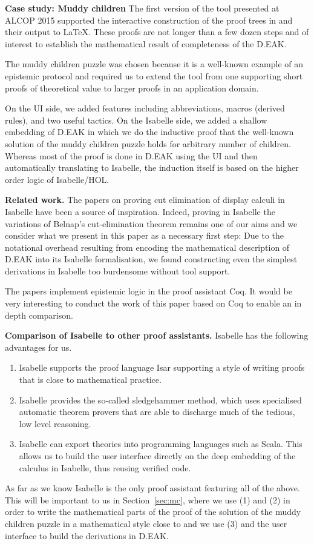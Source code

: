 \documentclass[runningheads,a4paper]{llncs}
\begin{document}
\medskip\noindent\textbf{Case study: Muddy children}
 The first version of the tool presented at ALCOP 2015 supported the interactive construction of the proof trees in \cite{DEAK} and their output to \LaTeX. These proofs are not longer than a few dozen steps and of interest to establish  the mathematical result of completeness of the D.EAK. 
 
The muddy children puzzle was chosen because it is a well-known example of an epistemic protocol and required us to extend the tool from one supporting short proofs of theoretical value to larger proofs in an application domain.
 
On the UI side, we added features including abbreviations, macros (derived rules), and two useful tactics. On the Isabelle side, we added a shallow embedding of D.EAK in which we do the inductive proof that the well-known solution of the muddy children puzzle holds for arbitrary number of children. Whereas most of the proof is done in D.EAK using the UI and then automatically translating to Isabelle, the induction itself is based on the higher order logic of Isabelle/HOL.

\medskip\noindent\textbf{Related work. } The papers \cite{DawsonG01,DawsonG02} on proving cut elimination of display calculi in Isabelle have been a source of inspiration. Indeed, proving in Isabelle the variations \cite{DEAK,Multitype,PDL} of Belnap's cut-elimination theorem remains one of our aims and we consider what we present in this paper as a necessary first step: Due to the notational overhead resulting from encoding the mathematical description of D.EAK into its  Isabelle formalisation, we found constructing even the simplest derivations in Isabelle too burdensome without tool support.


\medskip\noindent The papers \cite{Lescanne06,LescanneP07,Lescanne13} implement epistemic logic in the proof assistant Coq. It would be very interesting to conduct the work of this paper based on Coq to enable an in depth comparison.

\medskip\noindent\textbf{Comparison of Isabelle to other proof assistants. } Isabelle has the following advantages for us.
\begin{enumerate}
\item Isabelle supports the proof language Isar supporting a style of writing proofs that is close to mathematical practice. 
\item Isabelle provides the so-called sledgehammer method, which uses specialised automatic theorem provers that are able to discharge much of the tedious, low level reasoning. 
\item Isabelle can export theories into programming languages such as Scala. This allows us to build the user interface directly on the deep embedding of the calculus in Isabelle, thus reusing verified code.
\end{enumerate}
As far as we know Isabelle is the only proof assistant featuring all of the above. This will be important to us in Section~\ref{sec:mc}, where we use (1) and (2) in order to write the mathematical parts of the proof of the solution of the muddy children puzzle in a mathematical style close to \cite{MaPS14} and we use (3) and the user interface to build the derivations in D.EAK.
\end{document}
